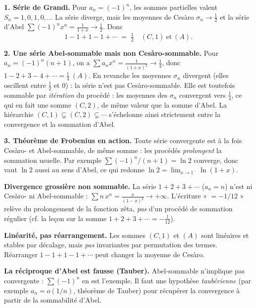 \decsep{}



\begin{mdframed}[style=exbar]
  \textbf{1. Série de Grandi.}\enspace{}%
  Pour $a_n=(-1)^n$, les sommes partielles valent $S_n=1,0,1,0,\dots$ La série
  diverge, mais les moyennes de Cesàro $\sigma_n\to\tfrac12$ et la série
  d'Abel $\sum(-1)^n x^n=\tfrac{1}{1+x}\to\tfrac12$. Donc
  \[
    1-1+1-1+\cdots \;=\; \tfrac12 \quad (C,1)\ \text{et}\ (A).
  \]

  \smallskip\noindent
  \textbf{2. Une série Abel-sommable mais non Cesàro-sommable.}\enspace%
  Pour $a_n=(-1)^n(n+1)$, on a $\sum a_n x^n=\tfrac{1}{(1+x)^2}\to\tfrac14$,
  donc $1-2+3-4+\cdots=\tfrac14\ (A)$. En revanche les moyennes $\sigma_n$
  divergent (elles oscillent entre $\tfrac12$ et $0$) : la série n'est pas
  Cesàro-sommable. Elle est toutefois sommable par \emph{itération} du procédé :
  les moyennes des $\sigma_n$ convergent vers $\tfrac14$, ce qui en fait une
  somme $(C,2)$, de même valeur que la somme d'Abel. La hiérarchie
  $(C,1)\subsetneq(C,2)\subsetneq\cdots$ s'échelonne ainsi strictement entre la
  convergence et la sommation d'Abel.

  \smallskip\noindent
  \textbf{3. Théorème de Frobenius en action.}\enspace%
  Toute série convergente est à la fois Cesàro- et Abel-sommable, de même
  somme : les procédés \emph{prolongent} la sommation usuelle. Par exemple
  $\sum(-1)^n/(n+1)=\ln 2$ converge, donc vaut $\ln 2$ aussi au sens d'Abel,
  ce qui redonne $\ln 2=\lim_{x\to1^-}\ln(1+x)$.
\end{mdframed}

\vspace{6pt}

\begin{mdframed}[style=cexbar]
  \textbf{Divergence grossière non sommable.}\enspace%
  La série $1+2+3+\cdots$ ($a_n=n$) n'est ni Cesàro- ni Abel-sommable :
  $\sum n\,x^n=\tfrac{x}{(1-x)^2}\to+\infty$. L'écriture « $=-1/12$ » relève du
  prolongement de la fonction zêta, \emph{pas} d'un procédé de sommation
  régulier (cf. la leçon sur la somme $1+2+3+\cdots=-\tfrac1{12}$).%

  \smallskip\noindent
  \textbf{Linéarité, pas réarrangement.}\enspace%
  Les sommes $(C,1)$ et $(A)$ sont linéaires et stables par décalage, mais
  \emph{pas} invariantes par permutation des termes. Réarranger
  $1-1+1-1+\cdots$ peut changer la moyenne de Cesàro.

  \smallskip\noindent
  \textbf{La réciproque d'Abel est fausse (Tauber).}\enspace%
  Abel-sommable n'implique pas convergente : $\sum(-1)^n$ en est l'exemple. Il
  faut une hypothèse \emph{taubérienne} (par exemple $a_n=o(1/n)$, théorème de
  Tauber) pour récupérer la convergence à partir de la sommabilité d'Abel.%
\end{mdframed}

